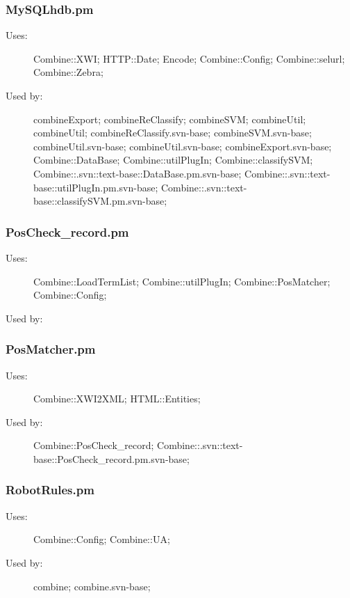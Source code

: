 \subsubsection{MySQLhdb.pm}
\begin{description}
\item[Uses:] Combine::XWI; HTTP::Date; Encode; Combine::Config; Combine::selurl; Combine::Zebra; 

\item[Used by:] combineExport; combineReClassify; combineSVM; combineUtil; combineUtil; combineReClassify.svn-base; combineSVM.svn-base; combineUtil.svn-base; combineUtil.svn-base; combineExport.svn-base; Combine::DataBase; Combine::utilPlugIn; Combine::classifySVM; Combine::.svn::text-base::DataBase.pm.svn-base; Combine::.svn::text-base::utilPlugIn.pm.svn-base; Combine::.svn::text-base::classifySVM.pm.svn-base; 

\end{description}
\subsubsection{PosCheck\_record.pm}
\begin{description}
\item[Uses:] Combine::LoadTermList; Combine::utilPlugIn; Combine::PosMatcher; Combine::Config; 

\item[Used by:] 

\end{description}
\subsubsection{PosMatcher.pm}
\begin{description}
\item[Uses:] Combine::XWI2XML; HTML::Entities; 

\item[Used by:] Combine::PosCheck\_record; Combine::.svn::text-base::PosCheck\_record.pm.svn-base; 

\end{description}
\subsubsection{RobotRules.pm}
\begin{description}
\item[Uses:] Combine::Config; Combine::UA; 

\item[Used by:] combine; combine.svn-base; 

\end{description}
